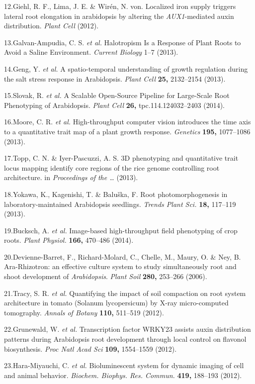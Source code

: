 \documentclass[]{article}
\begin{document}
12.Giehl, R. F., Lima, J. E. \& Wir{é}n, N. von. Localized iron supply
triggers lateral root elongation in arabidopsis by altering the
\emph{AUX1}-mediated auxin distribution. \emph{Plant Cell} (2012).

13.Galvan-Ampudia, C. S. \emph{et al.} Halotropism Is a Response of
Plant Roots to Avoid a Saline Environment. \emph{Current Biology} 1--7
(2013).

14.Geng, Y. \emph{et al.} A spatio-temporal understanding of growth
regulation during the salt stress response in Arabidopsis. \emph{Plant
Cell} \textbf{25,} 2132--2154 (2013).

15.Slovak, R. \emph{et al.} A Scalable Open-Source Pipeline for
Large-Scale Root Phenotyping of Arabidopsis. \emph{Plant Cell}
\textbf{26,} tpc.114.124032--2403 (2014).

16.Moore, C. R. \emph{et al.} High-throughput computer vision introduces
the time axis to a quantitative trait map of a plant growth response.
\emph{Genetics} \textbf{195,} 1077--1086 (2013).

17.Topp, C. N. \& Iyer-Pascuzzi, A. S. 3D phenotyping and quantitative
trait locus mapping identify core regions of the rice genome controlling
root architecture. in \emph{Proceedings of the \ldots{}} (2013).

18.Yokawa, K., Kagenishi, T. \& Balu{š}ka, F. Root photomorphogenesis in
laboratory-maintained Arabidopsis seedlings. \emph{Trends Plant Sci.}
\textbf{18,} 117--119 (2013).

19.Bucksch, A. \emph{et al.} Image-based high-throughput field
phenotyping of crop roots. \emph{Plant Physiol.} \textbf{166,} 470--486
(2014).

20.Devienne-Barret, F., Richard-Molard, C., Chelle, M., Maury, O. \&
Ney, B. Ara-Rhizotron: an effective culture system to study
simultaneously root and shoot development of \emph{Arabidopsis}.
\emph{Plant Soil} \textbf{280,} 253--266 (2006).

21.Tracy, S. R. \emph{et al.} Quantifying the impact of soil compaction
on root system architecture in tomato (Solanum lycopersicum) by X-ray
micro-computed tomography. \emph{Annals of Botany} \textbf{110,}
511--519 (2012).

22.Grunewald, W. \emph{et al.} Transcription factor WRKY23 assists auxin
distribution patterns during Arabidopsis root development through local
control on flavonol biosynthesis. \emph{Proc Natl Acad Sci}
\textbf{109,} 1554--1559 (2012).

23.Hara-Miyauchi, C. \emph{et al.} Bioluminescent system for dynamic
imaging of cell and animal behavior. \emph{Biochem. Biophys. Res.
Commun.} \textbf{419,} 188--193 (2012).
\end{document}
